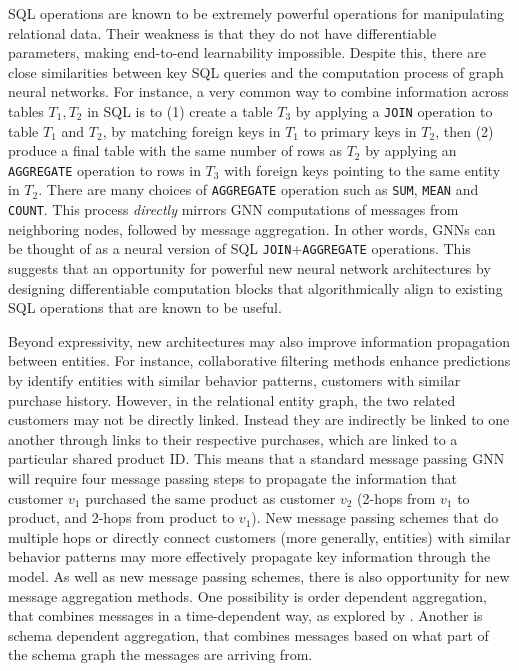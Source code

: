  SQL operations are known to be extremely powerful operations for manipulating relational data. Their weakness is that they do not have differentiable parameters, making end-to-end learnability impossible. Despite this, there are close similarities between key SQL queries and the computation process of graph neural networks. For instance, a very common way to combine information across tables $T_1,T_2$ in SQL is to (1) create a table $T_3$ by applying a \texttt{JOIN} operation to table $T_1$ and $T_2$, by matching foreign keys in $T_1$ to primary keys in $T_2$, then (2) produce a final table with the same number of rows as $T_2$ by applying an \texttt{AGGREGATE} operation to rows in $T_3$ with foreign keys pointing to the same entity in $T_2$. There are many choices of \texttt{AGGREGATE} operation such as \texttt{SUM}, \texttt{MEAN}  and  \texttt{COUNT}. This process \emph{directly} mirrors GNN computations of messages from neighboring nodes, followed by message aggregation. In other words, GNNs can be thought of as a neural version of SQL \texttt{JOIN}+\texttt{AGGREGATE} operations. This suggests that an opportunity for powerful new neural network architectures by designing differentiable computation blocks that algorithmically align \citep{xu2019can} to existing SQL operations that are known to be useful.


 Beyond expressivity, new architectures may also improve information propagation between entities. For instance, collaborative filtering methods enhance predictions by identify entities with similar behavior patterns, customers with similar purchase history. However, in the relational entity graph, the two related customers may not be directly linked. Instead they are indirectly be linked to one another through links to their respective purchases, which are linked to a particular shared product ID. This means that a standard message passing GNN will require four message passing steps to propagate the information that customer $v_1$ purchased the same product as customer $v_2$ (2-hops from $v_1$ to product, and 2-hops from product to $v_1$). New message passing schemes that do multiple hops or directly connect customers (more generally, entities) with similar behavior patterns may more effectively propagate key information through the model. As well as new message passing schemes, there is also opportunity for new message aggregation methods. One possibility is order dependent aggregation, that combines messages in a time-dependent way, as explored by \cite{yang2022stam}. Another is schema dependent aggregation, that combines messages based on what part of the schema graph the messages are arriving from.


